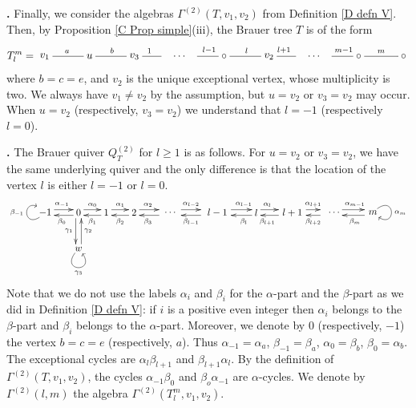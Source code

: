 \documentclass[12pt]{amsart}
\def \para{\refstepcounter{thm} \par\medskip\noindent
                \textbf{\thethm .} }
\numberwithin{equation}{thm}
\newcounter{ni}
\begin{document}
\para
Finally, we consider the algebras $\Gamma^{(2)}(T,v_1,v_2)$ from Definition \ref{D defn V}.
Then, by Proposition \ref{C Prop simple}(iii), the Brauer tree $T$ is of the form
\[T_{l}^{m}=
 \begin{xy}
(0,0)*[o]+{v_{1}}="3",(15,0)*[o]+{u}="u",(30,0)*[o]+{v_3}="001",(40,0)*[o]+{}="dammy1",
(45,0)*[o]+{\cdots}="cdots",(50,0)*[o]+{}="dammy2",(60,0)*[o]+{\circ}="002",(75,0)*[o]+{v_{2}}="2",(85,0)*[o]+{}="dammya",(90,0)*[o]+{\cdots}="\cdots",(95,0)*[o]+{}="dammyb",(105,0)*[o]+{\circ}="02",(120,0)*[o]+{\circ}="m",
\ar @{-}"3";"u"^{a}
\ar @{-}"u";"001"^{b}
\ar @{-}"001";"dammy1"^{1}
\ar @{-}"dammy2";"002"^{l-1}
\ar @{-}"002";"2"^{l}
\ar @{-}"2";"dammya"^{l+1}
\ar @{-}"dammyb";"02"^{m-1}
\ar @{-}"m";"02"_{m}
\end{xy}
\]
where $b=c=e$, and $v_2$ is the unique exceptional vertex, whose multiplicity is two. 
We always have $v_1\ne v_2$ by the assumption, but $u=v_2$ or $v_3=v_2$ may occur. When $u=v_2$ (respectively, $v_3=v_2$) we understand that $l=-1$ 
(respectively $l=0$). 

\para
The Brauer quiver $Q_{T}^{(2)}$ for $l\ge1$ is as follows. 
For $u=v_2$ or $v_3=v_2$, we have the same underlying quiver 
and the only difference is that the location of the vertex $l$ is either $l=-1$ or $l=0$.
\[\begin{xy}
(-55,0)*[o]+{-1}="a",(-43,0)*[o]+{0}="b",(-33,0)*[o]+{1}="1",(-23,0)*[o]+{2}="2", (-13,0)*[o]+{}="3", (-10,0)*{\cdots}="dot1",(-6,0)*{}="l-2",(1,0)*{}="d1",(7,0)*[o]+{l-1}="l-1",(12,0)*{}="d2",(21,0)*[o]+{l}="l",(29,0)*{}="d3",(34,0)*[o]+{l+1}="l+1",(39,0)*{}="d4",(44,0)*{}="d5", (49,0)*{\cdots}="dot2",(52,0)*{}="m-1",(61,0)*[o]+{}="d6",(63,0)*[o]+{m}="m",
(-43,-13)*[o]+{w}="w"
\ar @<1mm> "a";"b"^{\alpha_{-1}}
\ar @<1mm> "b";"a"^{\beta_{0}}
\ar @<1mm> "b";"1"^{\alpha_{0}}
\ar @<1mm> "1";"b"^{\beta_{1}}
\ar @<1mm> "1";"2"^{\alpha_{1}}
\ar @<1mm> "2";"1"^{\beta_{2}}
\ar @<1mm> "2";"3"^{\alpha_{2}}
\ar @<1mm> "3";"2"^{\beta_{3}}
\ar @<1mm> "l-2";"d1"^{\alpha_{l-2}}
\ar @<1mm> "d1";"l-2"^{\beta_{l-1}}
\ar @<1mm> "d2";"l"^{\alpha_{l-1}}
\ar @<1mm> "l";"d2"^{\beta_{l}}
\ar @<1mm> "l";"d3"^{\alpha_{l}}
\ar @<1mm> "d3";"l"^{\beta_{l+1}}
\ar @<1mm> "d4";"d5"^{\alpha_{l+1}}
\ar @<1mm> "d5";"d4"^{\beta_{l+2}}
\ar @<1mm> "m-1";"d6"^{\alpha_{m-1}}
\ar @<1mm> "d6";"m-1"^{\beta_{m}}
\ar @<-1mm> "b";"w"_{\gamma_{1}}
\ar @<-1mm> "w";"b"_{\gamma_{2}}
\SelectTips{eu}{}
\ar @(dl,ul)"a";"a"^{\beta_{-1}}
\ar @(ur,dr)"m";"m"^{\alpha_m}
\ar @(dl,dr)"w";"w"_{\gamma_{3}}
\end{xy}
\]
Note that we do not use the labels $\alpha_i$ and $\beta_i$ for the $\alpha$-part and the $\beta$-part 
as we did in Definition \ref{D defn V}: 
if $i$ is a positive even integer then $\alpha_i$ belongs to the $\beta$-part and 
$\beta_i$ belongs to the $\alpha$-part. 
Moreover, we denote by $0$ (respectively, $-1$) the vertex $b=c=e$ (respectively, $a$). 
Thus $\alpha_{-1}=\alpha_a$, $\beta_{-1}=\beta_a$, $\alpha_0=\beta_b$, $\beta_0=\alpha_b$. 
The exceptional cycles are $\alpha_{l}\beta_{l+1}$ and $\beta_{l+1}\alpha_l$.
By the definition of $\Gamma^{(2)}(T,v_1,v_2)$, the cycles $\alpha_{-1}\beta_{0}$ and $\beta_o\alpha_{-1}$ are $\alpha$-cycles. 
We denote by $\Gamma^{(2)}(l,m)$ the algebra $\Gamma^{(2)}(T_{l}^{m},v_1,v_2)$.
\end{document}

